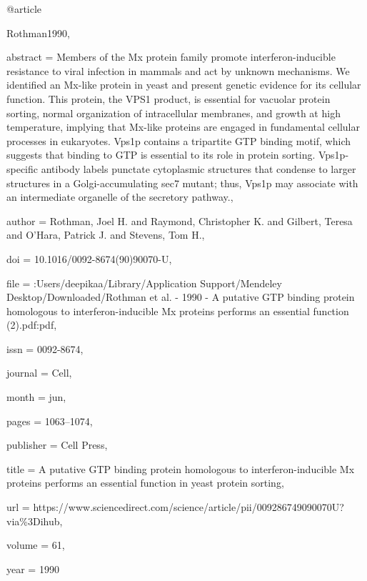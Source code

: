 @article{Rothman1990,

abstract = {Members of the Mx protein family promote interferon-inducible resistance to viral infection in mammals and act by unknown mechanisms. We identified an Mx-like protein in yeast and present genetic evidence for its cellular function. This protein, the VPS1 product, is essential for vacuolar protein sorting, normal organization of intracellular membranes, and growth at high temperature, implying that Mx-like proteins are engaged in fundamental cellular processes in eukaryotes. Vps1p contains a tripartite GTP binding motif, which suggests that binding to GTP is essential to its role in protein sorting. Vps1p-specific antibody labels punctate cytoplasmic structures that condense to larger structures in a Golgi-accumulating sec7 mutant; thus, Vps1p may associate with an intermediate organelle of the secretory pathway.},

author = {Rothman, Joel H. and Raymond, Christopher K. and Gilbert, Teresa and O'Hara, Patrick J. and Stevens, Tom H.},

doi = {10.1016/0092-8674(90)90070-U},

file = {:Users/deepikaa/Library/Application Support/Mendeley Desktop/Downloaded/Rothman et al. - 1990 - A putative GTP binding protein homologous to interferon-inducible Mx proteins performs an essential function (2).pdf:pdf},

issn = {0092-8674},

journal = {Cell},

month = {jun},

pages = {1063--1074},

publisher = {Cell Press},

title = {{A putative GTP binding protein homologous to interferon-inducible Mx proteins performs an essential function in yeast protein sorting}},

url = {https://www.sciencedirect.com/science/article/pii/009286749090070U?via{\%}3Dihub},

volume = {61},

year = {1990}

}

